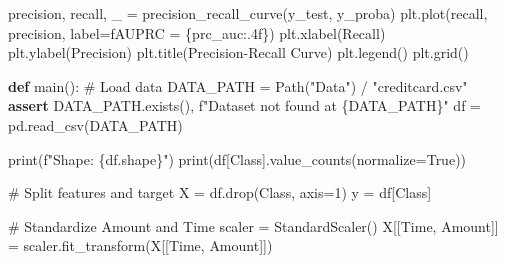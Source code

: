 \documentclass[
  letterpaper,
  DIV=11,
  numbers=noendperiod]{scrartcl}
\newenvironment{Shaded}{\begin{snugshade}}{\end{snugshade}}
\newcommand{\BuiltInTok}[1]{\textcolor[rgb]{0.00,0.23,0.31}{#1}}
\newcommand{\CommentTok}[1]{\textcolor[rgb]{0.37,0.37,0.37}{#1}}
\newcommand{\ControlFlowTok}[1]{\textcolor[rgb]{0.00,0.23,0.31}{\textbf{#1}}}
\newcommand{\DecValTok}[1]{\textcolor[rgb]{0.68,0.00,0.00}{#1}}
\newcommand{\KeywordTok}[1]{\textcolor[rgb]{0.00,0.23,0.31}{\textbf{#1}}}
\newcommand{\NormalTok}[1]{\textcolor[rgb]{0.00,0.23,0.31}{#1}}
\newcommand{\OperatorTok}[1]{\textcolor[rgb]{0.37,0.37,0.37}{#1}}
\newcommand{\SpecialCharTok}[1]{\textcolor[rgb]{0.37,0.37,0.37}{#1}}
\newcommand{\SpecialStringTok}[1]{\textcolor[rgb]{0.13,0.47,0.30}{#1}}
\newcommand{\StringTok}[1]{\textcolor[rgb]{0.13,0.47,0.30}{#1}}
\newcommand{\VariableTok}[1]{\textcolor[rgb]{0.07,0.07,0.07}{#1}}
\begin{document}
\begin{Shaded}
\begin{Highlighting}[]
\NormalTok{    precision, recall, \_ }\OperatorTok{=}\NormalTok{ precision\_recall\_curve(y\_test, y\_proba)}
\NormalTok{    plt.plot(recall, precision, label}\OperatorTok{=}\SpecialStringTok{f\textquotesingle{}AUPRC = }\SpecialCharTok{\{}\NormalTok{prc\_auc}\SpecialCharTok{:.4f\}}\SpecialStringTok{\textquotesingle{}}\NormalTok{)}
\NormalTok{    plt.xlabel(}\StringTok{\textquotesingle{}Recall\textquotesingle{}}\NormalTok{)}
\NormalTok{    plt.ylabel(}\StringTok{\textquotesingle{}Precision\textquotesingle{}}\NormalTok{)}
\NormalTok{    plt.title(}\StringTok{\textquotesingle{}Precision{-}Recall Curve\textquotesingle{}}\NormalTok{)}
\NormalTok{    plt.legend()}
\NormalTok{    plt.grid()}
    
    


\KeywordTok{def}\NormalTok{ main():}
    \CommentTok{\# Load data}
\NormalTok{    DATA\_PATH }\OperatorTok{=}\NormalTok{ Path(}\StringTok{"Data"}\NormalTok{) }\OperatorTok{/} \StringTok{"creditcard.csv"}
    \ControlFlowTok{assert}\NormalTok{ DATA\_PATH.exists(), }\SpecialStringTok{f"Dataset not found at }\SpecialCharTok{\{}\NormalTok{DATA\_PATH}\SpecialCharTok{\}}\SpecialStringTok{"}
\NormalTok{    df }\OperatorTok{=}\NormalTok{ pd.read\_csv(DATA\_PATH)}

    \BuiltInTok{print}\NormalTok{(}\SpecialStringTok{f"Shape: }\SpecialCharTok{\{}\NormalTok{df}\SpecialCharTok{.}\NormalTok{shape}\SpecialCharTok{\}}\SpecialStringTok{"}\NormalTok{)}
    \BuiltInTok{print}\NormalTok{(df[}\StringTok{\textquotesingle{}Class\textquotesingle{}}\NormalTok{].value\_counts(normalize}\OperatorTok{=}\VariableTok{True}\NormalTok{))}

    \CommentTok{\# Split features and target}
\NormalTok{    X }\OperatorTok{=}\NormalTok{ df.drop(}\StringTok{\textquotesingle{}Class\textquotesingle{}}\NormalTok{, axis}\OperatorTok{=}\DecValTok{1}\NormalTok{)}
\NormalTok{    y }\OperatorTok{=}\NormalTok{ df[}\StringTok{\textquotesingle{}Class\textquotesingle{}}\NormalTok{]}

    \CommentTok{\# Standardize \textquotesingle{}Amount\textquotesingle{} and \textquotesingle{}Time\textquotesingle{}}
\NormalTok{    scaler }\OperatorTok{=}\NormalTok{ StandardScaler()}
\NormalTok{    X[[}\StringTok{\textquotesingle{}Time\textquotesingle{}}\NormalTok{, }\StringTok{\textquotesingle{}Amount\textquotesingle{}}\NormalTok{]] }\OperatorTok{=}\NormalTok{ scaler.fit\_transform(X[[}\StringTok{\textquotesingle{}Time\textquotesingle{}}\NormalTok{, }\StringTok{\textquotesingle{}Amount\textquotesingle{}}\NormalTok{]])}


\end{Highlighting}
\end{Shaded}
\end{document}
